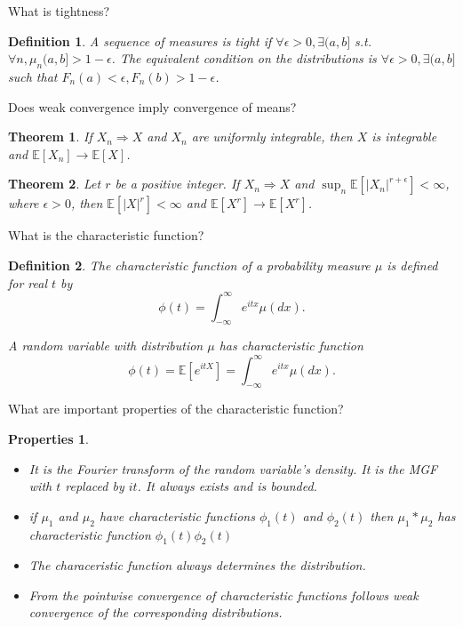 \documentclass[avery5388,grid,frame]{flashcards}
\newcommand{\E}{\mathbb{E}}
\newtheorem*{theorem}{Theorem}
\newtheorem*{definition}{Definition}
\newtheorem*{properties}{Properties}
\begin{document}
\begin{flashcard}
    {What is tightness?}
    \begin{definition}
        A sequence of measures is tight if $\forall \epsilon > 0, \exists (a,b]$ s.t. $\forall n, \mu_n(a,b] > 1 - \epsilon$. The equivalent condition on the distributions is $\forall \epsilon > 0, \exists (a,b]$ such that $F_n(a) < \epsilon, F_n(b) > 1 - \epsilon$.
    \end{definition}
\end{flashcard}


\begin{flashcard}
    {Does weak convergence imply convergence of means?}
    \begin{theorem}
        If $X_n \Rightarrow X$ and $X_n$ are uniformly integrable, then $X$ is integrable and $\E[X_n] \rightarrow \E[X]$.
    \end{theorem}

    \begin{theorem}
        Let $r$ be a positive integer. If $X_n \Rightarrow X$ and $\sup_n \E[|X_n|^{r+\epsilon}] < \infty$, where $\epsilon > 0$, then $\E[|X|^r] < \infty$ and $\E[X^r] \rightarrow \E[X^r]$.
    \end{theorem}
\end{flashcard}


\begin{flashcard}
    {What is the characteristic function? }
    \begin{definition}
        The characteristic function of a probability measure $\mu$ is defined for real $t$ by
        $$\phi(t) = \int_{-\infty}^\infty e^{itx} \mu(dx).$$

        A random variable with distribution $\mu$ has characteristic function
        $$\phi(t) = \E[e^{itX}] = \int_{-\infty}^\infty e^{itx} \mu(dx).$$
    \end{definition}
\end{flashcard}


\begin{flashcard}
    {What are important properties of the characteristic function?}
    \begin{properties}
        \begin{itemize}
            \item It is the Fourier transform of the random variable's density. It is the MGF with $t$ replaced by $it$. It always exists and is bounded.
            \item if $\mu_1$ and $\mu_2$ have characteristic functions $\phi_1(t)$ and $\phi_2(t)$ then $\mu_1 * \mu_2$ has characteristic function $\phi_1(t) \phi_2(t)$
            \item The characeristic function always determines the distribution.
            \item From the pointwise convergence of characteristic functions follows weak convergence of the corresponding distributions.
        \end{itemize}
    \end{properties}
\end{flashcard}
\end{document}
